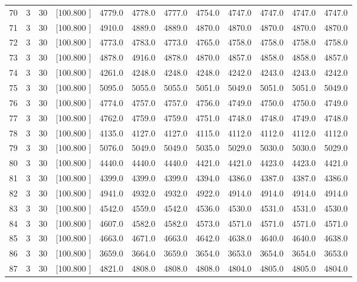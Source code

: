 \documentclass[12pt,a4paper]{article}
\begin{document}
\begin{center}
{\begin{tabular}{r r r r r r r r r r r r}
  70&  3& 30&[100.800   ]&  4779.0&  4778.0&  4777.0&  4754.0&  4747.0&  4747.0&  4747.0&  4747.0\\[-0.02in]
  71&  3& 30&[100.800   ]&  4910.0&  4889.0&  4889.0&  4870.0&  4870.0&  4870.0&  4870.0&  4870.0\\[-0.02in]
  72&  3& 30&[100.800   ]&  4773.0&  4783.0&  4773.0&  4765.0&  4758.0&  4758.0&  4758.0&  4758.0\\[-0.02in]
  73&  3& 30&[100.800   ]&  4878.0&  4916.0&  4878.0&  4870.0&  4857.0&  4858.0&  4858.0&  4857.0\\[-0.02in]
  74&  3& 30&[100.800   ]&  4261.0&  4248.0&  4248.0&  4248.0&  4242.0&  4243.0&  4243.0&  4242.0\\[-0.02in]
  75&  3& 30&[100.800   ]&  5095.0&  5055.0&  5055.0&  5051.0&  5049.0&  5051.0&  5051.0&  5049.0\\[-0.02in]
  76&  3& 30&[100.800   ]&  4774.0&  4757.0&  4757.0&  4756.0&  4749.0&  4750.0&  4750.0&  4749.0\\[-0.02in]
  77&  3& 30&[100.800   ]&  4762.0&  4759.0&  4759.0&  4751.0&  4748.0&  4748.0&  4749.0&  4748.0\\[-0.02in]
  78&  3& 30&[100.800   ]&  4135.0&  4127.0&  4127.0&  4115.0&  4112.0&  4112.0&  4112.0&  4112.0\\[-0.02in]
  79&  3& 30&[100.800   ]&  5076.0&  5049.0&  5049.0&  5035.0&  5029.0&  5030.0&  5030.0&  5029.0\\[-0.02in]
  80&  3& 30&[100.800   ]&  4440.0&  4440.0&  4440.0&  4421.0&  4421.0&  4423.0&  4423.0&  4421.0\\[-0.02in]
  81&  3& 30&[100.800   ]&  4399.0&  4399.0&  4399.0&  4394.0&  4386.0&  4387.0&  4387.0&  4386.0\\[-0.02in]
  82&  3& 30&[100.800   ]&  4941.0&  4932.0&  4932.0&  4922.0&  4914.0&  4914.0&  4914.0&  4914.0\\[-0.02in]
  83&  3& 30&[100.800   ]&  4542.0&  4559.0&  4542.0&  4536.0&  4530.0&  4531.0&  4531.0&  4530.0\\[-0.02in]
  84&  3& 30&[100.800   ]&  4607.0&  4582.0&  4582.0&  4573.0&  4571.0&  4571.0&  4571.0&  4571.0\\[-0.02in]
  85&  3& 30&[100.800   ]&  4663.0&  4671.0&  4663.0&  4642.0&  4638.0&  4640.0&  4640.0&  4638.0\\[-0.02in]
  86&  3& 30&[100.800   ]&  3659.0&  3664.0&  3659.0&  3654.0&  3653.0&  3654.0&  3654.0&  3653.0\\[-0.02in]
  87&  3& 30&[100.800   ]&  4821.0&  4808.0&  4808.0&  4808.0&  4804.0&  4805.0&  4805.0&  4804.0\\[-0.02in]

\end{tabular}}
\end{center}
\end{document}
